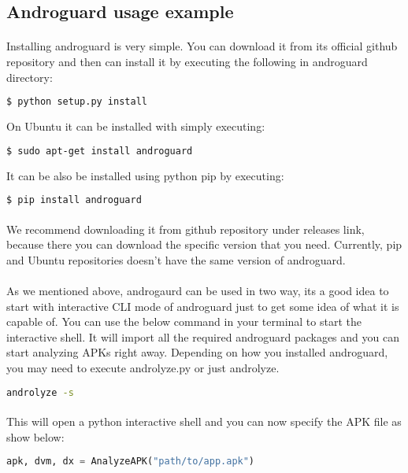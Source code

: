 \documentclass[../main.tex]{subfile}
\begin{document}
		\subsection{Androguard usage example}\label{subsec:androguard_usage}
			\paragraph{} Installing androguard is very simple. You can download it from its official github repository \cite{desnos2017androguard} and then can install it by executing the following in androguard directory:
			\begin{lstlisting}[language=bash, numbers=none]
				$ python setup.py install
			\end{lstlisting}
			On Ubuntu it can be installed with simply executing:
			\begin{lstlisting}[language=bash, numbers=none]
				$ sudo apt-get install androguard
			\end{lstlisting}
			It can be also be installed using python pip by executing:
			\begin{lstlisting}[language=bash, numbers=none]
				$ pip install androguard
			\end{lstlisting}
			\paragraph{} We recommend downloading it from github repository under releases link, because there you can download the specific version that you need. Currently, pip and Ubuntu repositories doesn't have the same version of androguard.

			\paragraph{} As we mentioned above, androgaurd can be used in two way, its a good idea to start with interactive CLI mode of androguard just to get some idea of what it is capable of. You can use the below command in your terminal to start the interactive shell. It will import all the required androguard packages and you can start analyzing APKs right away. Depending on how you installed androguard, you may need to execute androlyze.py or just androlyze.
				\begin{lstlisting}[language=bash, xrightmargin = 0.7\textwidth, numbers=none]
					androlyze -s
				\end{lstlisting}
			\paragraph{} This will open a python interactive shell and you can now specify the APK file as show below:
				\begin{lstlisting}[language=python, numbers=none]
					apk, dvm, dx = AnalyzeAPK("path/to/app.apk")
				\end{lstlisting}
\end{document}

